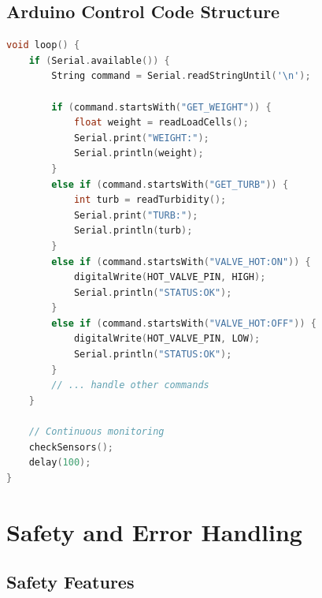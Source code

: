 \subsection{Arduino Control Code Structure}

\begin{lstlisting}[language=C++, caption={Arduino Main Loop Pseudocode}, label={lst:arduino}]
void loop() {
    if (Serial.available()) {
        String command = Serial.readStringUntil('\n');
        
        if (command.startsWith("GET_WEIGHT")) {
            float weight = readLoadCells();
            Serial.print("WEIGHT:");
            Serial.println(weight);
        }
        else if (command.startsWith("GET_TURB")) {
            int turb = readTurbidity();
            Serial.print("TURB:");
            Serial.println(turb);
        }
        else if (command.startsWith("VALVE_HOT:ON")) {
            digitalWrite(HOT_VALVE_PIN, HIGH);
            Serial.println("STATUS:OK");
        }
        else if (command.startsWith("VALVE_HOT:OFF")) {
            digitalWrite(HOT_VALVE_PIN, LOW);
            Serial.println("STATUS:OK");
        }
        // ... handle other commands
    }
    
    // Continuous monitoring
    checkSensors();
    delay(100);
}
\end{lstlisting}

\section{Safety and Error Handling}

\subsection{Safety Features}

